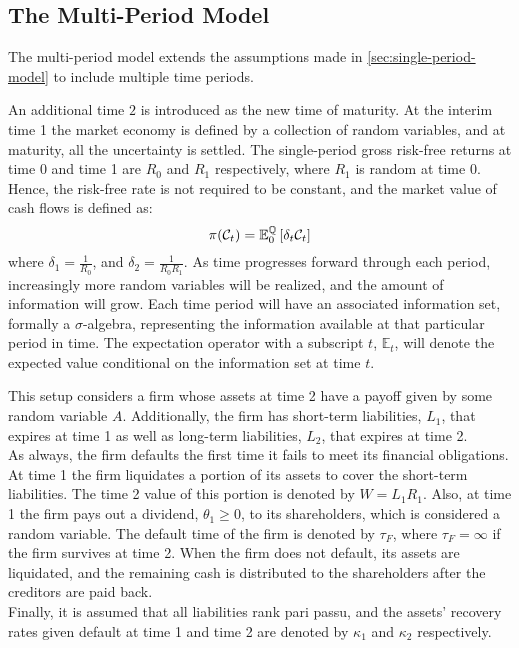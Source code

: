 \documentclass[main.tex]{subfiles}
\begin{document}
    \subsection{The Multi-Period Model}
        The multi-period model extends the assumptions made in \cref{sec:single-period-model} to include multiple time periods.

        An additional time $2$ is introduced as the new time of maturity.
        At the interim time 1 the market economy is defined by a collection of random variables,
        and at maturity, all the uncertainty is settled. 
        The single-period gross risk-free returns at time 0 and time 1 are $R_0$ and $R_1$ respectively, where $R_1$ is random at time 0.
        Hence, the risk-free rate is not required to be constant,
        and the market value of cash flows is defined as:
        \begin{equation*}
            \pi(\mathcal{C}_{t}) =
            \mathbb{E}_{0}^{\mathbb{Q}}\left[\delta_t\mathcal{C}_{t}\right]
        \end{equation*}
        where $\delta_1 = \frac{1}{R_0}$,
        and $\delta_2 = \frac{1}{R_{0}R_{1}}$.
        As time progresses forward through each period, 
        increasingly more random variables will be realized,
        and the amount of information will grow.
        Each time period will have an associated information set, formally a $\sigma$-algebra,
        representing the information available at that particular period in time.
        The expectation operator with a subscript $t$, $\mathbb{E}_{t}$, 
        will denote the expected value conditional on the information set at time $t$.

        This setup considers a firm whose assets at time 2 have a payoff given by some random variable $A$.
        Additionally, the firm has short-term liabilities, $L_1$, that expires at time 1 as well as long-term liabilities, $L_2$, that expires at time 2.
        \\
        As always, the firm defaults the first time it fails to meet its financial obligations.
        At time 1 the firm liquidates a portion of its assets to cover the short-term liabilities.
        The time 2 value of this portion is denoted by $W = L_1 R_1$.
        Also, at time 1 the firm pays out a dividend, $\theta_1 \geq 0$, to its shareholders,
        which is considered a random variable.
        The default time of the firm is denoted by $\tau_{F}$,
        where $\tau_{F} = \infty$ if the firm survives at time 2.
        When the firm does not default, its assets are liquidated, 
        and the remaining cash is distributed to the shareholders after the creditors are paid back.
        \\
        Finally, it is assumed that all liabilities rank pari passu,
        and the assets' recovery rates given default at time 1 and time 2 
        are denoted by $\kappa_1$ and $\kappa_2$ respectively.
\end{document}
